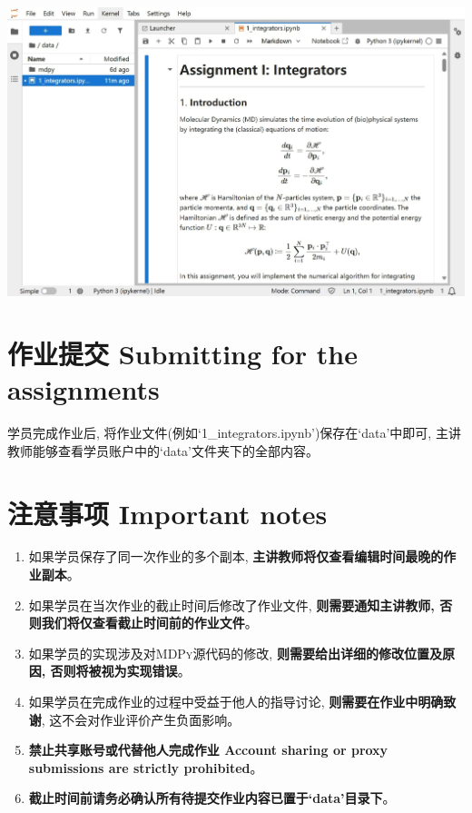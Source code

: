 \documentclass{article}
\begin{document}
\centerline{\includegraphics[scale=0.8]{figs/system1.jpg}}

\section*{作业提交 Submitting for the assignments}

学员完成作业后, 将作业文件(例如`1\_integrators.ipynb')保存在`data'中即可, 主讲教师能够查看学员账户中的`data'文件夹下的全部内容。

\section*{注意事项 Important notes}

\begin{enumerate}
  \item 如果学员保存了同一次作业的多个副本, \textbf{主讲教师将仅查看编辑时间最晚的作业副本}。
  \item 如果学员在当次作业的截止时间后修改了作业文件, \textbf{则需要通知主讲教师, 否则我们将仅查看截止时间前的作业文件}。
  \item 如果学员的实现涉及对\textsc{MDPy}源代码的修改, \textbf{则需要给出详细的修改位置及原因, 否则将被视为实现错误}。
  \item 如果学员在完成作业的过程中受益于他人的指导讨论, \textbf{则需要在作业中明确致谢}, 这不会对作业评价产生负面影响。
  \item \textbf{禁止共享账号或代替他人完成作业 Account sharing or proxy submissions are strictly prohibited}。
  \item {\bf \color{myred} 截止时间前请务必确认所有待提交作业内容已置于`data'目录下}。
\end{enumerate}
\end{document}
